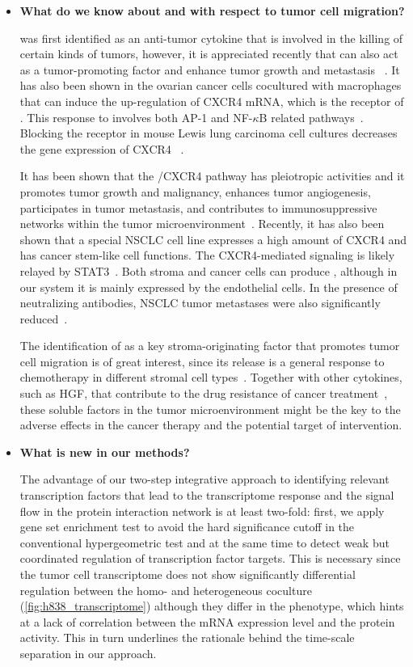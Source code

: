 \begin{itemize}
\item \textbf{What do we know about \tnfa and \sdfonea with respect to tumor cell migration?}

\tnfa was first identified as an anti-tumor cytokine that is involved in the killing
of certain kinds of tumors, however, it is appreciated recently that \tnfa can also 
act as a tumor-promoting factor and enhance tumor growth and metastasis%
~\citep{Wu2010}. It has also been shown in the ovarian cancer cells cocultured with
macrophages that \tnfa can induce the up-regulation of 
CXCR4 mRNA, which is the receptor of \sdfonea. This response to \tnfa involves both
AP-1 and NF-$\kappa$B related pathways~\citep{Kulbe2005}. Blocking the \tnfa receptor
in mouse Lewis lung carcinoma cell cultures decreases the gene expression of CXCR4~%
\citep{Sasi2011}.

It has been shown that the \sdfonea/CXCR4 pathway has pleiotropic activities and it 
promotes tumor growth and malignancy, enhances tumor angiogenesis, participates in tumor metastasis, and contributes to immunosuppressive networks within the tumor microenvironment~\citep{Kryczek2007}. 
Recently, it has also been shown that a special NSCLC cell line expresses a
high amount of CXCR4 and has cancer stem-like cell functions. The CXCR4-mediated
signaling is likely relayed by STAT3~\citep{Jung2013}.
Both stroma and cancer cells can produce \sdfonea, 
although in our system it is mainly expressed by the endothelial cells. In the presence of neutralizing \sdfonea antibodies, NSCLC tumor metastases were also significantly reduced~\citep{Phillips2003}.

The identification of \tnfa as a key stroma-originating factor that promotes 
tumor cell migration is of great interest, since its release is a general response to chemotherapy in different stromal cell types~\citep{Acharyya2012}. Together with
other cytokines, such as HGF, that contribute to the drug resistance of cancer
treatment~\citep{Straussman2012}, these soluble factors in the tumor microenvironment
might be the key to the adverse effects in the cancer therapy and the potential target of intervention.


\item \textbf{What is new in our methods?}

The advantage of our two-step integrative approach to identifying 
relevant transcription factors that lead to the transcriptome response
and the signal flow in the protein interaction network 
is at least two-fold: first, we apply gene set enrichment test to avoid the hard 
significance cutoff in the conventional hypergeometric test and at the same time
to detect weak but coordinated regulation of transcription factor targets. This is 
necessary since the tumor cell transcriptome does not show significantly
differential regulation between the homo- and heterogeneous coculture 
(\ref{fig:h838_transcriptome}) although they differ in the phenotype, which 
hints at a lack of correlation between the mRNA expression level and the protein 
activity. This in turn underlines the rationale behind the time-scale separation
in our approach. 


\end{itemize}
